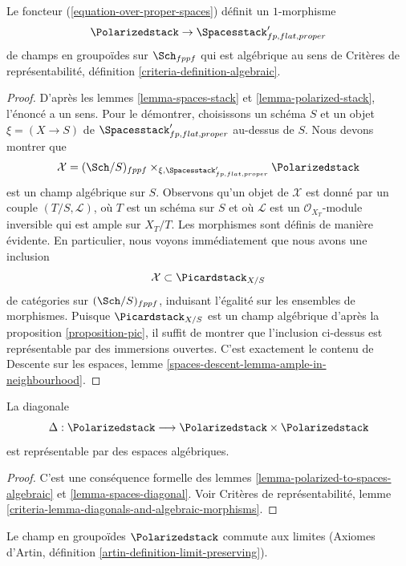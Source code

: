 \begin{lemma}
\label{lemma-polarized-to-spaces-algebraic}
Le foncteur (\ref{equation-over-proper-spaces}) définit un $1$-morphisme
$$
\Polarizedstack \to \Spacesstack'_{fp, flat, proper}
$$
de champs en groupoïdes sur $\Sch_{fppf}$ qui est algébrique au sens de
Critères de représentabilité, définition
\ref{criteria-definition-algebraic}.
\end{lemma}

\begin{proof}
D'après les lemmes \ref{lemma-spaces-stack} et
\ref{lemma-polarized-stack}, l'énoncé a un sens. Pour le démontrer,
choisissons un schéma $S$ et un objet
$\xi = (X \to S)$ de $\Spacesstack'_{fp, flat, proper}$ au-dessus de $S$.
Nous devons montrer que
$$
\mathcal{X} = (\Sch/S)_{fppf} \times_{\xi, \Spacesstack'_{fp, flat, proper}}
\Polarizedstack
$$
est un champ algébrique sur $S$. Observons qu'un objet de $\mathcal{X}$ est
donné par un couple $(T/S, \mathcal{L})$, où $T$ est un schéma sur $S$ et où
$\mathcal{L}$ est un $\mathcal{O}_{X_T}$-module inversible qui est ample sur
$X_T/T$. Les morphismes sont définis de manière évidente.
En particulier, nous voyons immédiatement que nous avons une inclusion
$$
\mathcal{X} \subset \Picardstack_{X/S}
$$
de catégories sur $(\Sch/S)_{fppf}$, induisant l'égalité sur les ensembles de
morphismes. Puisque $\Picardstack_{X/S}$ est un champ algébrique d'après la
proposition \ref{proposition-pic}, il suffit de montrer que l'inclusion
ci-dessus est représentable par des immersions ouvertes. C'est exactement le
contenu de Descente sur les espaces, lemme
\ref{spaces-descent-lemma-ample-in-neighbourhood}.
\end{proof}

\begin{lemma}
\label{lemma-polarized-diagonal}
La diagonale
$$
\Delta : \Polarizedstack \longrightarrow
\Polarizedstack \times \Polarizedstack
$$
est représentable par des espaces algébriques.
\end{lemma}

\begin{proof}
C'est une conséquence formelle des lemmes
\ref{lemma-polarized-to-spaces-algebraic} et
\ref{lemma-spaces-diagonal}.
Voir Critères de représentabilité, lemme
\ref{criteria-lemma-diagonals-and-algebraic-morphisms}.
\end{proof}

\begin{lemma}
\label{lemma-polarized-limits}
Le champ en groupoïdes $\Polarizedstack$ commute aux limites
(Axiomes d'Artin, définition \ref{artin-definition-limit-preserving}).
\end{lemma}

